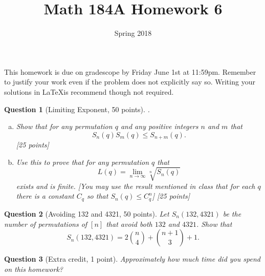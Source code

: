 \documentclass{article}
\title{Math 184A Homework 6}
\date{Spring 2018}
\newtheorem{ques}{Question}
\begin{document}
\maketitle

This homework is due on gradescope by Friday June 1st at 11:59pm. Remember to justify your work even if the problem does not explicitly say so. Writing your solutions in \LaTeX is recommend though not required.

\begin{ques}[Limiting Exponent, 50 points].\\
\begin{enumerate}[(a)]
\item Show that for any permutation $q$ and any positive integers $n$ and $m$ that
$$
S_n(q)S_m(q) \leq S_{n+m}(q).
$$
[25 points]
\item Use this to prove that for any permutation $q$ that
$$
L(q) = \lim_{n\rightarrow \infty} \sqrt[n]{S_n(q)}
$$
exists and is finite. [You may use the result mentioned in class that for each $q$ there is a constant $C_q$ so that $S_n(q) \leq C_q^n$] [25 points]
\end{enumerate}
\end{ques}

\begin{ques}[Avoiding 132 and 4321, 50 points]
Let $S_n(132,4321)$ be the number of permutations of $[n]$ that avoid both $132$ and $4321$. Show that
$$
S_n(132,4321) = 2\binom{n}{4} + \binom{n+1}{3}+1.
$$
\end{ques}

\begin{ques}[Extra credit, 1 point]
Approximately how much time did you spend on this homework?
\end{ques}
\end{document}
